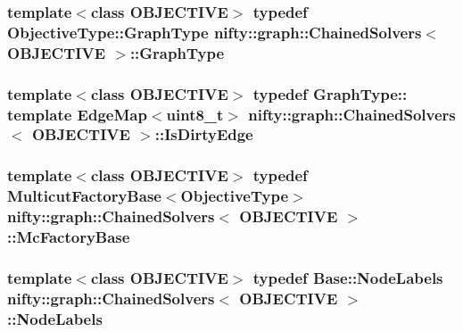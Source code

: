\subsubsection[{Graph\+Type}]{\setlength{\rightskip}{0pt plus 5cm}template$<$class O\+B\+J\+E\+C\+T\+I\+V\+E$>$ typedef Objective\+Type\+::\+Graph\+Type {\bf nifty\+::graph\+::\+Chained\+Solvers}$<$ O\+B\+J\+E\+C\+T\+I\+V\+E $>$\+::{\bf Graph\+Type}}\label{classnifty_1_1graph_1_1ChainedSolvers_ab55e77819ad5f20d4c1193ed745b49fe}
\hypertarget{classnifty_1_1graph_1_1ChainedSolvers_a85e87137c3b85a8f4c4a64fba26394c3}{}
\subsubsection[{Is\+Dirty\+Edge}]{\setlength{\rightskip}{0pt plus 5cm}template$<$class O\+B\+J\+E\+C\+T\+I\+V\+E$>$ typedef Graph\+Type\+:: template Edge\+Map$<$uint8\+\_\+t$>$ {\bf nifty\+::graph\+::\+Chained\+Solvers}$<$ O\+B\+J\+E\+C\+T\+I\+V\+E $>$\+::{\bf Is\+Dirty\+Edge}}\label{classnifty_1_1graph_1_1ChainedSolvers_a85e87137c3b85a8f4c4a64fba26394c3}
\hypertarget{classnifty_1_1graph_1_1ChainedSolvers_a8a106a334a73a0dd278d06af04ef163d}{}
\subsubsection[{Mc\+Factory\+Base}]{\setlength{\rightskip}{0pt plus 5cm}template$<$class O\+B\+J\+E\+C\+T\+I\+V\+E$>$ typedef {\bf Multicut\+Factory\+Base}$<${\bf Objective\+Type}$>$ {\bf nifty\+::graph\+::\+Chained\+Solvers}$<$ O\+B\+J\+E\+C\+T\+I\+V\+E $>$\+::{\bf Mc\+Factory\+Base}}\label{classnifty_1_1graph_1_1ChainedSolvers_a8a106a334a73a0dd278d06af04ef163d}
\hypertarget{classnifty_1_1graph_1_1ChainedSolvers_a68ac6338bbf4e29e0324152d462715de}{}
\subsubsection[{Node\+Labels}]{\setlength{\rightskip}{0pt plus 5cm}template$<$class O\+B\+J\+E\+C\+T\+I\+V\+E$>$ typedef {\bf Base\+::\+Node\+Labels} {\bf nifty\+::graph\+::\+Chained\+Solvers}$<$ O\+B\+J\+E\+C\+T\+I\+V\+E $>$\+::{\bf Node\+Labels}}\label{classnifty_1_1graph_1_1ChainedSolvers_a68ac6338bbf4e29e0324152d462715de}
\hypertarget{classnifty_1_1graph_1_1ChainedSolvers_a963bd16d8459fe660e207c4a57facf5e}{}
